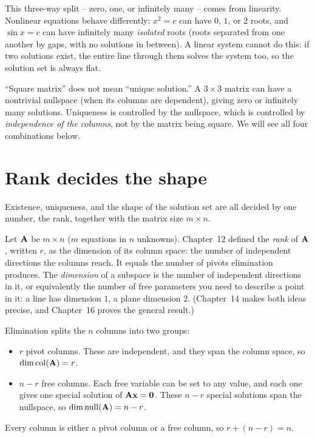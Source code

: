 \begin{aestheticbox}
This three-way split -- zero, one, or infinitely many -- comes from linearity.
Nonlinear equations behave differently: $x^2=c$ can have $0$, $1$, or $2$ roots, and
$\sin x=c$ can have infinitely many \emph{isolated} roots (roots separated from one another
by gaps, with no solutions in between). A linear system cannot do this: if two solutions
exist, the entire line through them solves the system too, so the solution set is always
flat.
\end{aestheticbox}

\begin{trapbox}
``Square matrix'' does not mean ``unique solution.'' A $3\times3$ matrix can have a
nontrivial nullspace (when its columns are dependent), giving zero or infinitely many
solutions. Uniqueness is controlled by the nullspace, which is controlled by
\emph{independence of the columns}, not by the matrix being square. We will see all four
combinations below.
\end{trapbox}

\section{Rank decides the shape}

Existence, uniqueness, and the shape of the solution set are all decided by one number,
the rank, together with the matrix size $m\times n$.

Let $\mathbf{A}$ be $m\times n$ ($m$ equations in $n$ unknowns). Chapter~12 defined the
\emph{rank} of $\mathbf{A}$, written $r$, as the dimension of its column space: the number of
independent directions the columns reach. It equals the number of pivots elimination
produces. The \emph{dimension} of a subspace is the number of independent directions in it,
or equivalently the number of free parameters you need to describe a point in it: a line has
dimension $1$, a plane dimension $2$. (Chapter~14 makes both ideas precise, and Chapter~16
proves the general result.)

Elimination splits the $n$ columns into two groups:
\begin{itemize}
  \item $r$ pivot columns. These are independent, and they span the column space, so
    $\dim\operatorname{col}(\mathbf{A})=r$.
  \item $n-r$ free columns. Each free variable can be set to any value, and each one gives
    one special solution of $\mathbf{A}\mathbf{x}=\mathbf{0}$. These $n-r$ special solutions span
    the nullspace, so $\dim\operatorname{null}(\mathbf{A})=n-r$.
\end{itemize}
Every column is either a pivot column or a free column, so $r+(n-r)=n$.

